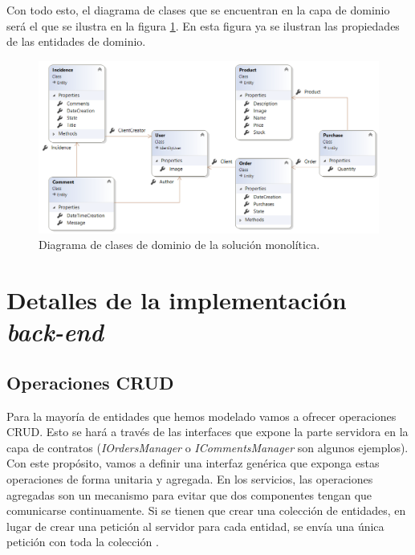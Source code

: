 \documentclass[11pt,spanish,listoffigures]{tfgetsinf}
\begin{document}
Con todo esto, el diagrama de clases que se encuentran en la capa de dominio será el que se ilustra en la figura \ref{fig:ClassDiagram}. En esta figura ya se ilustran las propiedades de las entidades de dominio.

\begin{figure}[h]
\centering
\includegraphics[scale=0.65]{ClassDiagram}
\caption{Diagrama de clases de dominio de la solución monolítica.}
\label{fig:ClassDiagram}
\end{figure}

\newpage

\section{Detalles de la implementación \textit{back-end}}

\subsection{Operaciones CRUD} \label{subsect:CRUD}

Para la mayoría de entidades que hemos modelado vamos a ofrecer operaciones CRUD. Esto se hará a través de las interfaces que expone la parte servidora en la capa de contratos (\textit{IOrdersManager} o \textit{ICommentsManager} son algunos ejemplos). Con este propósito, vamos a definir una interfaz genérica que exponga estas operaciones de forma unitaria y agregada. En los servicios, las operaciones agregadas son un mecanismo para evitar que dos componentes tengan que comunicarse continuamente. Si se tienen que crear una colección de entidades, en lugar de crear una petición al servidor para cada entidad, se envía una única petición con toda la colección \cite{Newman2015a}.
\end{document}
